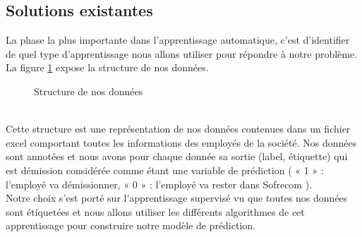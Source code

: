 \subsection{Solutions existantes}
La phase la plus importante dans l'apprentissage automatique, c'est d'identifier de quel type d'apprentissage nous allons utiliser pour répondre à notre problème.\\
La figure \ref{fig:usecasedata} expose la structure de nos données.
 \begin{figure}[htpb]
    \centering
    \caption{Structure de nos données}
    \label{fig:usecasedata}
    \end{figure}
    \\
Cette structure est une représentation de nos données contenues dans  un fichier excel comportant toutes les informations des employés de la société.
Nos données sont annotées et nous avons pour chaque donnée sa sortie (label, étiquette) qui est démission considérée comme étant une variable de prédiction ( « 1 » : l'employé va démissionner,   « 0 » : l’employé va rester dans Sofrecom  ).\\
Notre choix s'est porté sur l'apprentissage supervisé vu que toutes nos données sont étiquetées et nous allons utiliser les différents algorithmes de cet apprentissage pour construire notre modèle de prédiction.
